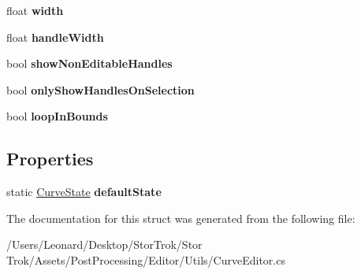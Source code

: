 \begin{DoxyCompactItemize}
float {\bfseries width}
\item 
\mbox{\label{struct_unity_editor_1_1_post_processing_1_1_curve_editor_1_1_curve_state_aa6ad60ca2b5f41ebea15dd2d3ae04ea5}} 
float {\bfseries handle\+Width}
\item 
\mbox{\label{struct_unity_editor_1_1_post_processing_1_1_curve_editor_1_1_curve_state_adec4e2428c2e0b45f2694c7e8fa27977}} 
bool {\bfseries show\+Non\+Editable\+Handles}
\item 
\mbox{\label{struct_unity_editor_1_1_post_processing_1_1_curve_editor_1_1_curve_state_ab2ec9070b560ab71548f0c78e34a7c5f}} 
bool {\bfseries only\+Show\+Handles\+On\+Selection}
\item 
\mbox{\label{struct_unity_editor_1_1_post_processing_1_1_curve_editor_1_1_curve_state_abb8b6af015fa2f97da6bc16a573f1bf7}} 
bool {\bfseries loop\+In\+Bounds}
\end{DoxyCompactItemize}
\subsection*{Properties}
\begin{DoxyCompactItemize}
\item 
\mbox{\label{struct_unity_editor_1_1_post_processing_1_1_curve_editor_1_1_curve_state_a525752786a73cecd0e5efa7ae3856e67}} 
static \hyperlink{struct_unity_editor_1_1_post_processing_1_1_curve_editor_1_1_curve_state}{Curve\+State} {\bfseries default\+State}
\end{DoxyCompactItemize}


The documentation for this struct was generated from the following file\+:\begin{DoxyCompactItemize}
\item 
/\+Users/\+Leonard/\+Desktop/\+Stor\+Trok/\+Stor Trok/\+Assets/\+Post\+Processing/\+Editor/\+Utils/Curve\+Editor.\+cs\end{DoxyCompactItemize}
